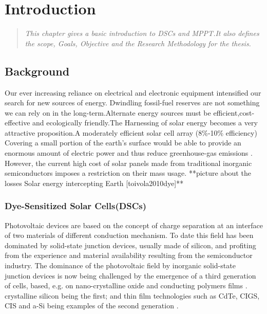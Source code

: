\chapter{Introduction}
\begin{quote} 
\it This chapter gives a basic introduction to  \ac{DSCs} and \ac{MPPT}.It also defines the scope, Goals, Objective and the Research Methodology for the thesis.
\end{quote}

\section{Background}

Our ever increasing reliance on electrical and electronic equipment intensified our search for new sources of energy. Dwindling fossil-fuel reserves are not something we can rely on in the long-term.Alternate energy sources must be efficient,cost-effective and ecologically friendly.The Harnessing of solar energy becomes a very attractive proposition.A moderately efficient solar cell array (8\%-10\% efficiency) Covering a small portion of the earth's surface would be able to provide an enormous amount of electric power and thus reduce greenhouse-gas emissions \cite{kalyanasundaram2010dye}. However, the current high cost of solar panels made from traditional inorganic semiconductors imposes a restriction on their mass usage.
 **picture about the losses  Solar energy intercepting Earth [toivola2010dye]**
 
 \subsection{Dye-Sensitized Solar Cells(DSCs)}
  Photovoltaic devices are based on the concept of charge separation at an interface of two materials of different conduction mechanism. To date this field has been dominated by solid-state junction devices, usually made of silicon, and profiting from the experience and material availability resulting from the semiconductor industry. The dominance of the photovoltaic field by inorganic solid-state junction devices is now being challenged by the emergence of a third generation of cells, based, e.g. on nano-crystalline oxide and conducting polymers films \cite{gratzel2004conversion}.
  crystalline silicon being the first; and thin film technologies such as \ac{CdTe}, \ac{CIGS}, \ac{CIS} and \ac{a-Si} being examples of the second generation \cite{toivola2010dye}.\\
  
